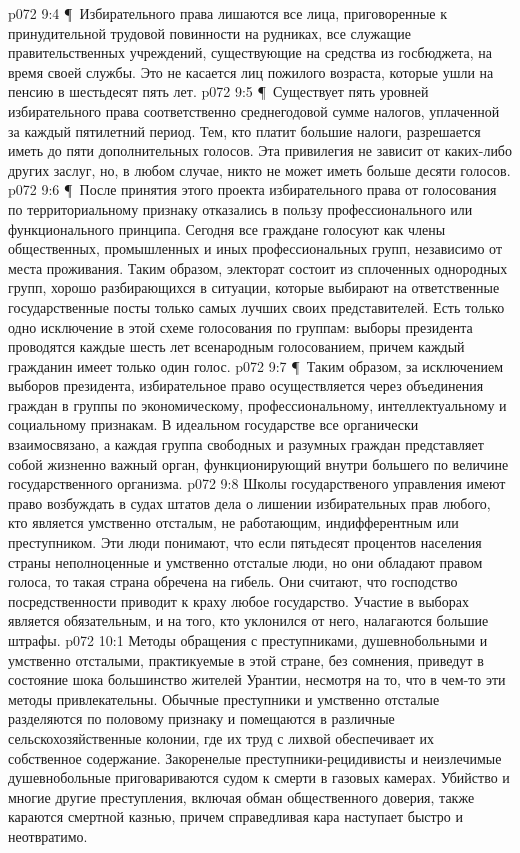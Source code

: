 \vs p072 9:4 \P\ \bibnobreakspace Избирательного права лишаются все лица, приговоренные к принудительной трудовой повинности на рудниках, все служащие правительственных учреждений, существующие на средства из госбюджета, на время своей службы. Это не касается лиц пожилого возраста, которые ушли на пенсию в шестьдесят пять лет.
\vs p072 9:5 \P\ \bibnobreakspace Существует пять уровней избирательного права соответственно среднегодовой сумме налогов, уплаченной за каждый пятилетний период. Тем, кто платит большие налоги, разрешается иметь до пяти дополнительных голосов. Эта привилегия не зависит от каких\hyp{}либо других заслуг, но, в любом случае, никто не может иметь больше десяти голосов.
\vs p072 9:6 \P\ \bibnobreakspace После принятия этого проекта избирательного права от голосования по территориальному признаку отказались в пользу профессионального или функционального принципа. Сегодня все граждане голосуют как члены общественных, промышленных и иных профессиональных групп, независимо от места проживания. Таким образом, электорат состоит из сплоченных однородных групп, хорошо разбирающихся в ситуации, которые выбирают на ответственные государственные посты только самых лучших своих представителей. Есть только одно исключение в этой схеме голосования по группам: выборы президента проводятся каждые шесть лет всенародным голосованием, причем каждый гражданин имеет только один голос.
\vs p072 9:7 \P\ Таким образом, за исключением выборов президента, избирательное право осуществляется через объединения граждан в группы по экономическому, профессиональному, интеллектуальному и социальному признакам. В идеальном государстве все органически взаимосвязано, а каждая группа свободных и разумных граждан представляет собой жизненно важный орган, функционирующий внутри большего по величине государственного организма.
\vs p072 9:8 Школы государственого управления имеют право возбуждать в судах штатов дела о лишении избирательных прав любого, кто является умственно отсталым, не работающим, индифферентным или преступником. Эти люди понимают, что если пятьдесят процентов населения страны неполноценные и умственно отсталые люди, но они обладают правом голоса, то такая страна обречена на гибель. Они считают, что господство посредственности приводит к краху любое государство. Участие в выборах является обязательным, и на того, кто уклонился от него, налагаются большие штрафы.
\vs p072 10:1 Методы обращения с преступниками, душевнобольными и умственно отсталыми, практикуемые в этой стране, без сомнения, приведут в состояние шока большинство жителей Урантии, несмотря на то, что в чем\hyp{}то эти методы привлекательны. Обычные преступники и умственно отсталые разделяются по половому признаку и помещаются в различные сельскохозяйственные колонии, где их труд с лихвой обеспечивает их собственное содержание. Закоренелые преступники\hyp{}рецидивисты и неизлечимые душевнобольные приговариваются судом к смерти в газовых камерах. Убийство и многие другие преступления, включая обман общественного доверия, также караются смертной казнью, причем справедливая кара наступает быстро и неотвратимо.
